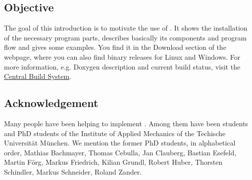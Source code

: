 \subsection{Objective}
The goal of this introduction is to motivate the use of \MBSim{}. It shows the installation of the necessary program parts, describes basically its components and program flow and gives some examples. You find it in the Download section of the \MBSim{} webpage, where you can also find binary releases for Linux and Windows. For more information, e.g. Doxygen description and current build status, visit the {\href{http://www4.amm.mw.tu-muenchen.de:8080/mbsim-env/}{\textsf{Central Build System}}}.
%
\subsection{Acknowledgement}
Many people have been helping to implement \MBSim{}. Among them have been students and PhD students of the Institute of Applied Mechanics of the Techische Universit\"at M\"unchen. We mention the former PhD students, in alphabetical order, Mathias Bachmayer, Thomas Cebulla, Jan Clauberg, Bastian Esefeld, Martin F\"org, Markus Friedrich, Kilian Grundl, Robert Huber, Thorsten Schindler, Markus Schneider, Roland Zander. 

